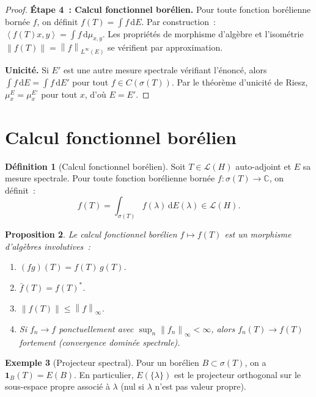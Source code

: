 \documentclass[a4paper,12pt]{book}
\newcommand{\C}{\mathbb{C}}
\newcommand{\dd}{\mathrm{d}}
\newcommand{\norm}[1]{\left\| #1 \right\|}
\newcommand{\inner}[2]{\left\langle #1, #2 \right\rangle}
\theoremstyle{definition}
\newtheorem{definition}{Définition}[chapter]
\newtheorem{exemple}[definition]{Exemple}
\theoremstyle{plain}
\newtheorem{proposition}[definition]{Proposition}
\theoremstyle{remark}
\begin{document}
\begin{proof}
\textbf{Étape 4~: Calcul fonctionnel borélien.}
Pour toute fonction borélienne bornée $f$, on définit $f(T) = \int f\,\dd E$. Par
construction~: $\inner{f(T)x}{y} = \int f\,\dd\mu_{x,y}$. Les propriétés de morphisme
d'algèbre et l'isométrie $\norm{f(T)} = \norm{f}_{L^\infty(E)}$ se vérifient par
approximation.

\textbf{Unicité.} Si $E'$ est une autre mesure spectrale vérifiant l'énoncé, alors
$\int f\,\dd E = \int f\,\dd E'$ pour tout $f \in C(\sigma(T))$. Par le théorème
d'unicité de Riesz, $\mu_x^E = \mu_x^{E'}$ pour tout $x$, d'où $E = E'$.
\end{proof}

\section{Calcul fonctionnel borélien}

\begin{definition}[Calcul fonctionnel borélien]
\label{def:calcul-borelien}
Soit $T \in \mathcal{L}(H)$ auto-adjoint et $E$ sa mesure spectrale. Pour toute fonction
borélienne bornée $f : \sigma(T) \to \C$, on définit~:
\[
  f(T) = \int_{\sigma(T)} f(\lambda)\, \dd E(\lambda) \in \mathcal{L}(H).
\]
\end{definition}

\begin{proposition}
\label{prop:calcul-borelien-prop}
Le calcul fonctionnel borélien $f \mapsto f(T)$ est un morphisme d'algèbres involutives~:
\begin{enumerate}[label=(\roman*)]
  \item $(fg)(T) = f(T)\,g(T)$.
  \item $\bar f(T) = f(T)^*$.
  \item $\norm{f(T)} \le \norm{f}_\infty$.
  \item Si $f_n \to f$ ponctuellement avec $\sup_n \norm{f_n}_\infty < \infty$, alors
        $f_n(T) \to f(T)$ fortement (convergence dominée spectrale).
\end{enumerate}
\end{proposition}

\begin{exemple}[Projecteur spectral]
\label{ex:proj-spectral}
Pour un borélien $B \subset \sigma(T)$, on a $\mathbf{1}_B(T) = E(B)$. En particulier,
$E(\{\lambda\})$ est le projecteur orthogonal sur le sous-espace propre associé à
$\lambda$ (nul si $\lambda$ n'est pas valeur propre).
\end{exemple}
\end{document}
